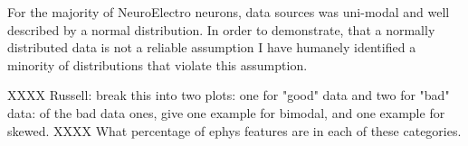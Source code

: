 %    
%
%
%

%
For the majority of NeuroElectro neurons, data sources was uni-modal and well described by a normal distribution. In order to demonstrate, that a normally distributed data is not a reliable assumption I have humanely identified a minority of distributions that violate this assumption.

XXXX Russell: break this into two plots: one for "good" data and two for "bad" data: of the bad data ones, give one example for bimodal, and one example for skewed.
XXXX What percentage of ephys features are in each of these categories.
    
